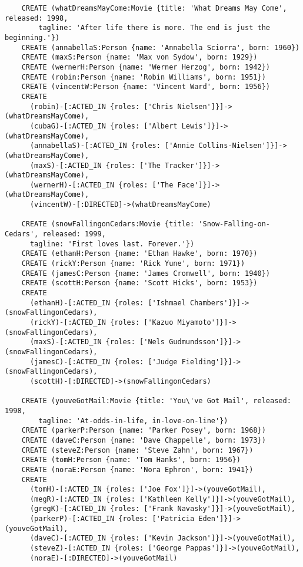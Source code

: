 \begin{lstlisting}
	CREATE (whatDreamsMayCome:Movie {title: 'What Dreams May Come', released: 1998,
	    tagline: 'After life there is more. The end is just the beginning.'})
	CREATE (annabellaS:Person {name: 'Annabella Sciorra', born: 1960})
	CREATE (maxS:Person {name: 'Max von Sydow', born: 1929})
	CREATE (wernerH:Person {name: 'Werner Herzog', born: 1942})
	CREATE (robin:Person {name: 'Robin Williams', born: 1951})
	CREATE (vincentW:Person {name: 'Vincent Ward', born: 1956})
	CREATE
	  (robin)-[:ACTED_IN {roles: ['Chris Nielsen']}]->(whatDreamsMayCome),
	  (cubaG)-[:ACTED_IN {roles: ['Albert Lewis']}]->(whatDreamsMayCome),
	  (annabellaS)-[:ACTED_IN {roles: ['Annie Collins-Nielsen']}]->(whatDreamsMayCome),
	  (maxS)-[:ACTED_IN {roles: ['The Tracker']}]->(whatDreamsMayCome),
	  (wernerH)-[:ACTED_IN {roles: ['The Face']}]->(whatDreamsMayCome),
	  (vincentW)-[:DIRECTED]->(whatDreamsMayCome)
	
	CREATE (snowFallingonCedars:Movie {title: 'Snow-Falling-on-Cedars', released: 1999,
	  tagline: 'First loves last. Forever.'})
	CREATE (ethanH:Person {name: 'Ethan Hawke', born: 1970})
	CREATE (rickY:Person {name: 'Rick Yune', born: 1971})
	CREATE (jamesC:Person {name: 'James Cromwell', born: 1940})
	CREATE (scottH:Person {name: 'Scott Hicks', born: 1953})
	CREATE
	  (ethanH)-[:ACTED_IN {roles: ['Ishmael Chambers']}]->(snowFallingonCedars),
	  (rickY)-[:ACTED_IN {roles: ['Kazuo Miyamoto']}]->(snowFallingonCedars),
	  (maxS)-[:ACTED_IN {roles: ['Nels Gudmundsson']}]->(snowFallingonCedars),
	  (jamesC)-[:ACTED_IN {roles: ['Judge Fielding']}]->(snowFallingonCedars),
	  (scottH)-[:DIRECTED]->(snowFallingonCedars)
	
	CREATE (youveGotMail:Movie {title: 'You\'ve Got Mail', released: 1998,
	    tagline: 'At-odds-in-life, in-love-on-line'})
	CREATE (parkerP:Person {name: 'Parker Posey', born: 1968})
	CREATE (daveC:Person {name: 'Dave Chappelle', born: 1973})
	CREATE (steveZ:Person {name: 'Steve Zahn', born: 1967})
	CREATE (tomH:Person {name: 'Tom Hanks', born: 1956})
	CREATE (noraE:Person {name: 'Nora Ephron', born: 1941})
	CREATE
	  (tomH)-[:ACTED_IN {roles: ['Joe Fox']}]->(youveGotMail),
	  (megR)-[:ACTED_IN {roles: ['Kathleen Kelly']}]->(youveGotMail),
	  (gregK)-[:ACTED_IN {roles: ['Frank Navasky']}]->(youveGotMail),
	  (parkerP)-[:ACTED_IN {roles: ['Patricia Eden']}]->(youveGotMail),
	  (daveC)-[:ACTED_IN {roles: ['Kevin Jackson']}]->(youveGotMail),
	  (steveZ)-[:ACTED_IN {roles: ['George Pappas']}]->(youveGotMail),
	  (noraE)-[:DIRECTED]->(youveGotMail)
	

\end{lstlisting}
